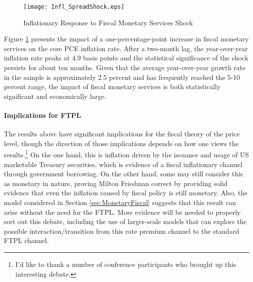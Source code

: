 \documentclass[11pt,a4paper,margin=1.5in]{article}
\begin{document}
\begin{figure}[h]
\centering
\texttt{[image: Infl\_SpreadShock.eps]}
\caption{Inflationary Response to Fiscal Monetary Services Shock}
\label{fig:IRF}
\end{figure}
Figure \ref{fig:IRF} presents the impact of a one-percentage-point increase in fiscal monetary services on the core PCE inflation rate.
After a two-month lag, the year-over-year inflation rate peaks at 4.9 basis points and the statistical significance of the shock persists for about ten months.
Given that the average year-over-year growth rate in the sample is approximately 2.5 percent and has frequently reached the 5-10 percent range, the impact of fiscal monetary services is both statistically significant and economically large. 


\paragraph{Implications for FTPL}
The results above have significant implications for the fiscal theory of the price level, though the direction of those implications depends on how one views the results.\footnote{
	I'd like to thank a number of conference participants who brought up this interesting debate.}
On the one hand, this is inflation driven by the issuance and usage of US marketable Treasury securities, which is evidence of a fiscal inflationary channel through government borrowing.
On the other hand, some may still consider this as monetary in nature, proving Milton Friedman correct by providing solid evidence that even the inflation caused by fiscal policy is still monetary. 
Also, the model considered in Section \ref{sec:MonetaryFiscal} suggests that this result can arise without the need for the FTPL. 
More evidence will be needed to properly sort out this debate, including the use of larger-scale models that can explore the possible interaction/transition from this rate premium channel to the standard FTPL channel.
\end{document}
